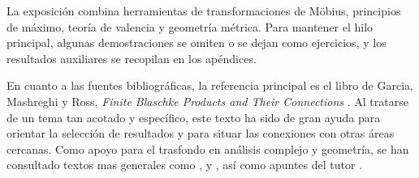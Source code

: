 La exposición combina herramientas de transformaciones de Möbius, principios de máximo, teoría de valencia y geometría métrica. Para mantener el hilo principal, algunas demostraciones se omiten o se dejan como ejercicios, y los resultados auxiliares se recopilan en los apéndices.

En cuanto a las fuentes bibliográficas, la referencia principal es el libro de Garcia, Mashreghi y Ross, \emph{Finite Blaschke Products and Their Connections} \cite{garciaFiniteBlaschkeProducts2018}.
Al tratarse de un tema tan acotado y específico, este texto ha sido de gran ayuda para orientar la selección de resultados y para situar las conexiones con otras áreas cercanas.
Como apoyo para el trasfondo en análisis complejo y geometría, se han consultado textos mas generales como \cite{krantzComplexAnalysisGeometric2004}, \cite{priestleyIntroductionComplexAnalysis2009} y \cite{ahlforsComplexAnalysisIntroduction1979}, así como apuntes del tutor \cite{Vukotic2020}.
